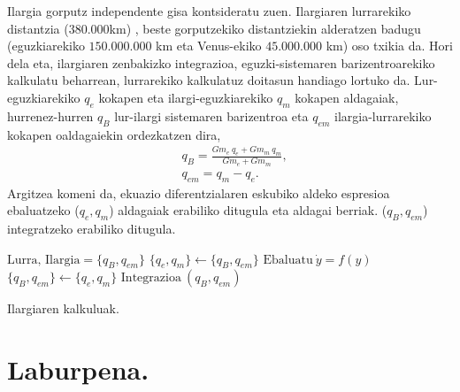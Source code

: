 Ilargia gorputz independente gisa kontsideratu zuen. Ilargiaren lurrarekiko distantzia ($380.000$km) , beste gorputzekiko distantziekin alderatzen badugu (eguzkiarekiko $150.000.000$ km eta Venus-ekiko $45.000.000$ km) oso txikia da. Hori dela eta, ilargiaren zenbakizko integrazioa, eguzki-sistemaren barizentroarekiko kalkulatu beharrean, lurrarekiko kalkulatuz doitasun handiago lortuko da. Lur-eguzkiarekiko $q_e$ kokapen eta ilargi-eguzkiarekiko $q_m$ kokapen aldagaiak, hurrenez-hurren $q_B$ lur-ilargi sistemaren barizentroa eta $q_{em}$ ilargia-lurrarekiko kokapen oaldagaiekin ordezkatzen dira,
\begin{align*}
& q_B =\frac{Gm_e \ q_e+Gm_m \ q_m}{Gm_e+Gm_m},\\
& q_{em} =q_m-q_e.
\end{align*}
Argitzea komeni da, ekuazio diferentzialaren eskubiko aldeko espresioa ebaluatzeko ($q_e,q_m$) aldagaiak erabiliko ditugula eta aldagai berriak. ($q_B,q_{em}$) integratzeko erabiliko ditugula.

\begin{algorithm}[H]
 \BlankLine
  $\mbox{Lurra, Ilargia}=\{q_B,q_{em}\}$\;
  {
   \BlankLine
     $\{q_e,q_m\} \leftarrow \{q_B,q_{em}\} $\;
     $\mbox{Ebaluatu} \ \dot{y}=f(y)$\;
     $ \{q_B,q_{em}\} \leftarrow \{q_e,q_m\} $\;
     $\mbox{Integrazioa}\ (q_B,q_{em})$\;
   \BlankLine
  }
 \caption{Ilargiaren kalkuluak.}
\end{algorithm}

\begin{table}[h]
\caption{Ilargiaren Lurrarekiko hasierako balioak.}
\label{tab:1}       %
\centering
{}
\end{table}     
          


\section{Laburpena.}

